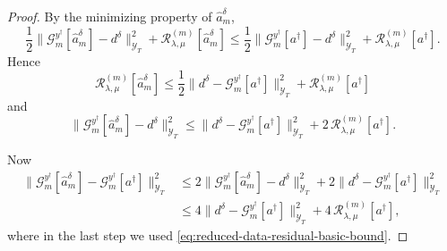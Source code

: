\documentclass{article}
\theoremstyle{definition}
\begin{document}
\begin{proof}
    By the minimizing property of \(\hat a_m^\delta\),
    \[
        \frac12\|\mathcal G_m^{y^\dagger}[\hat a_m^\delta]-d^\delta\|_{\mathcal Y_T}^2
        +
        \mathcal R_{\lambda,\mu}^{(m)}[\hat a_m^\delta]
        \le
        \frac12\|\mathcal G_m^{y^\dagger}[a^\dagger]-d^\delta\|_{\mathcal Y_T}^2
        +
        \mathcal R_{\lambda,\mu}^{(m)}[a^\dagger].
    \]
    Hence
    \begin{equation}
        \label{eq:reduced-minimizer-basic-bound}
        \mathcal R_{\lambda,\mu}^{(m)}[\hat a_m^\delta]
        \le
        \frac12\|d^\delta-\mathcal G_m^{y^\dagger}[a^\dagger]\|_{\mathcal Y_T}^2
        +
        \mathcal R_{\lambda,\mu}^{(m)}[a^\dagger]
    \end{equation}
    and
    \begin{equation}
        \label{eq:reduced-data-residual-basic-bound}
        \|\mathcal G_m^{y^\dagger}[\hat a_m^\delta]-d^\delta\|_{\mathcal Y_T}^2
        \le
        \|d^\delta-\mathcal G_m^{y^\dagger}[a^\dagger]\|_{\mathcal Y_T}^2
        +
        2\,\mathcal R_{\lambda,\mu}^{(m)}[a^\dagger].
    \end{equation}

    Now
    \begin{align*}
        \|\mathcal G_m^{y^\dagger}[\hat a_m^\delta]-\mathcal G_m^{y^\dagger}[a^\dagger]\|_{\mathcal Y_T}^2
         & \le
        2\|\mathcal G_m^{y^\dagger}[\hat a_m^\delta]-d^\delta\|_{\mathcal Y_T}^2
        +
        2\|d^\delta-\mathcal G_m^{y^\dagger}[a^\dagger]\|_{\mathcal Y_T}^2 \\
         & \le
        4\|d^\delta-\mathcal G_m^{y^\dagger}[a^\dagger]\|_{\mathcal Y_T}^2
        +
        4\,\mathcal R_{\lambda,\mu}^{(m)}[a^\dagger],
    \end{align*}
    where in the last step we used \eqref{eq:reduced-data-residual-basic-bound}.


\end{proof}
\end{document}
